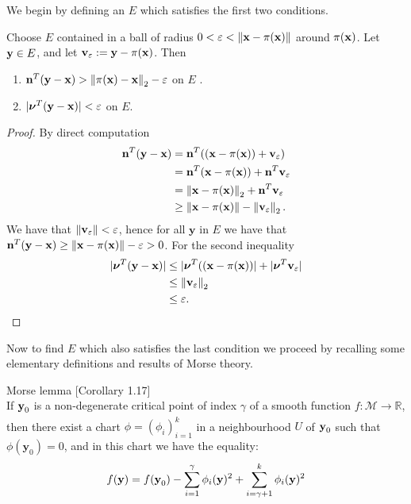 We begin by defining an $E$ which satisfies the first two conditions.
\begin{lemma}
\label{ch3:lemma:small_projection}
Choose $E$ contained in a ball of radius $0 < \varepsilon < \left\lVert \textup{\textbf{x}} - \pi(\textup{\textbf{x}}) \right\rVert$ around $\pi(\textup{\textbf{x}})$. Let $\textup{\textbf{y}} \in E$, and let $ \textup{\textbf{v}}_\varepsilon := \textup{\textbf{y}} - \pi(\textup{\textbf{x}}) $. Then 
    \begin{enumerate}
        \item $\textup{\textbf{n}}^T(\textup{\textbf{y}}-\textup{\textbf{x}}) > \left\lVert \pi(\textup{\textbf{x}}) - \textup{\textbf{x}} \right\rVert_2 - \varepsilon $ on $E$ .
        \item $|\boldsymbol{\nu}^T(\textup{\textbf{y}}-\textup{\textbf{x}})| < \varepsilon$ on $E$.
    \end{enumerate}
\end{lemma}
\begin{proof}
By direct computation
\begin{align*}
   \textbf{n}^T(\textbf{y}-\textbf{x}) &= \textbf{n}^T( (\textbf{x} - \pi(\textbf{x})) + \textbf{v}_\varepsilon)\\
   &= \textbf{n}^T(\textbf{x} - \pi(\textbf{x})) + \textbf{n}^T\textbf{v}_\varepsilon \\
   &= \left\lVert \textbf{x} - \pi(\textbf{x}) \right\rVert_2 + \textbf{n}^T\textbf{v}_\varepsilon\\
   &\geq  \left\lVert \textbf{x} - \pi(\textbf{x}) \right\rVert - \left\lVert \textbf{v}_\varepsilon \right\rVert_2.
\end{align*}   
We have that $\left\lVert \textbf{v}_\varepsilon \right\rVert < \varepsilon$, hence for all $\textbf{y}$ in $E$ we have that $ \textbf{n}^T(\textbf{y}-\textbf{x}) \geq \left\lVert \textbf{x} - \pi(\textbf{x}) \right\rVert - \varepsilon > 0 $. For the second inequality \begin{align*}
    | \boldsymbol{\nu}^T(\textbf{y}-\textbf{x}) | &\leq | \boldsymbol{\nu}^T( (\textbf{x} - \pi(\textbf{x}))| + |\boldsymbol{\nu}^T\textbf{v}_\varepsilon|  \\
    &\leq  \left\lVert \textbf{v}_\varepsilon \right\rVert_2 \\ 
    &\leq \varepsilon.
\end{align*}
\end{proof}


Now to find $E$ which also satisfies the last condition we proceed by recalling some elementary definitions and results of Morse theory.

\begin{theorem}
Morse lemma [Corollary 1.17]\cite{nicolaescu2011morse_theory} \\
If $\textup{\textbf{y}}_0$ is a non-degenerate critical point of index $\gamma$ of a smooth function $f : \mathcal{M} \xrightarrow[]{} \mathbb{R}$, then there exist a chart $\phi = (\phi_i)_{i=1}^k$  in a neighbourhood $U$ of $\textup{\textbf{y}}_0$ such that $\phi(\textbf{y}_0) = 0$, and in this chart we have the equality:
$$ f(\textup{\textbf{y}}) = f(\textup{\textbf{y}}_0) - \sum_{i=1}^\gamma \phi_i(\textup{\textbf{y}})^2 + \sum_{i=\gamma + 1}^k \phi_i(\textup{\textbf{y}})^2 $$
\end{theorem}


